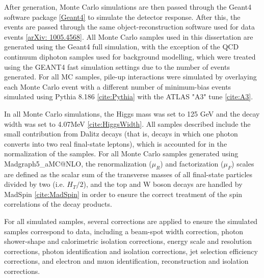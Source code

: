 After generation, Monte Carlo simulations are then passed through the Geant4 software package \ref{Geant4} to simulate the detector response. After this, the events are passed through the same object-reconstruction software used for data events \ref{arXiv: 1005.4568}. All Monte Carlo samples used in this dissertation are generated using the Geant4 full simulation, with the exception of the QCD continuum diphoton samples used for background modelling, which were treated using the GEANT4 fast simulation settings due to the number of events generated. For all MC samples, pile-up interactions were simulated by overlaying each Monte Carlo event with a different number of minimum-bias events simulated using Pythia 8.186 \ref{cite:Pythia} with the ATLAS "A3" tune \ref{cite:A3}.

In all Monte Carlo simulations, the Higgs mass was set to 125 GeV and the decay width was set to 4.07MeV \ref{cite:HiggsWidth}. All samples described include the small contribution from Dalitz decays (that is, decays in which one photon converts into two real final-state leptons), which is accounted for in the normalization of the samples. For all Monte Carlo samples generated using Madgraph5\_aMC@NLO, the renormalization ($\mu_{R}$) and factorization ($\mu_{F}$) scales are defined as the scalar sum of the transverse masses of all final-state particles divided by two (i.e. $H_{T}/2$), and the top and W boson decays are handled by MadSpin \ref{cite:MadSpin} in order to ensure the correct treatment of the spin correlations of the decay products.

For all simulated samples, several corrections are applied to ensure the simulated samples correspond to data, including a beam-spot width correction, photon shower-shape and calorimetric isolation corrections, energy scale and resolution corrections, photon identification and isolation corrections, jet selection efficiency corrections, and electron and muon identification, reconstruction and isolation corrections.

